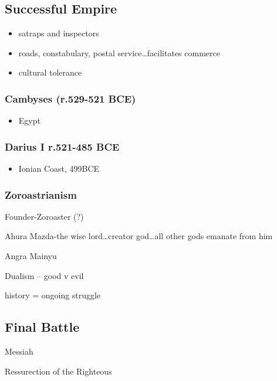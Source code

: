 \documentclass[11pt, a4paper]{article}
\begin{document}
\subsection{Successful Empire}
\begin{itemize}
  \item satraps and inspectors
  \item roads, constabulary, postal service\dots facilitates commerce
  \item cultural tolerance
\end{itemize}
\subsubsection{Cambyses (r.529-521 BCE)}
\begin{itemize}
  \item Egypt
\end{itemize}
\subsubsection{Darius I r.521-485 BCE}
\begin{itemize}
  \item Ionian Coast, 499BCE
\end{itemize}
\subsubsection{Zoroastrianism}
Founder-Zoroaster (?)

Ahura Mazda-the wise lord\dots creator god\dots all other gods emanate from him

Angra Mainyu

Dualism -- good v evil

history = ongoing struggle

\subsection{Final Battle}
Messiah

Ressurection of the Righteous
\end{document}
